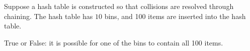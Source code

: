 \begin{prob}
    Suppose a hash table is constructed so that collisions are resolved through
    chaining. The hash table has $10$ bins, and 100 items are inserted into the
    hash table.

    True or False: it is possible for one of the bins to contain all 100 items.

    \Tf

\end{prob}
